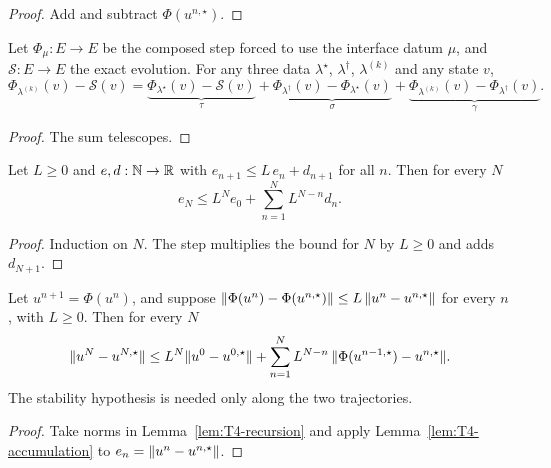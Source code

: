 \begin{proof}
  \leanok
  Add and subtract $\Phi(u^{n,\star})$.
\end{proof}

\begin{lemma}\label{lem:T4-split}
  \leanok
  Let $\Phi_\mu:E\to E$ be the composed step forced to use the interface datum
  $\mu$, and $\mathcal S:E\to E$ the exact evolution.  For any three data
  $\lambda^\star$, $\lambda^\dagger$, $\lambda^{(k)}$ and any state $v$,
  \[
    \Phi_{\lambda^{(k)}}(v)-\mathcal S(v)
    =\underbrace{\Phi_{\lambda^\star}(v)-\mathcal S(v)}_{\tau}
    +\underbrace{\Phi_{\lambda^\dagger}(v)-\Phi_{\lambda^\star}(v)}_{\sigma}
    +\underbrace{\Phi_{\lambda^{(k)}}(v)-\Phi_{\lambda^\dagger}(v)}_{\gamma}.
  \]
\end{lemma}

\begin{proof}
  \leanok
  The sum telescopes.
\end{proof}

\begin{lemma}[T4c, accumulation]\label{lem:T4-accumulation}
  \leanok
  Let $L\ge0$ and $e,d:\mathbb{N}\to\mathbb{R}$ with $e_{n+1}\le L\,e_n+d_{n+1}$ for all $n$.
  Then for every $N$
  \[
    e_N\le L^N e_0+\sum_{n=1}^{N}L^{N-n}d_n .
  \]
\end{lemma}

\begin{proof}
  \leanok
  Induction on $N$.  The step multiplies the bound for $N$ by $L\ge0$ and adds
  $d_{N+1}$.
\end{proof}

\begin{theorem}\label{thm:T4}
  \leanok
  Let $u^{n+1}=\Phi(u^n)$, and suppose
  $\lVert \Phi(u^n)-\Phi(u^{n,\star})\rVert\le L\,\lVert u^n-u^{n,\star}\rVert$ for every
  $n$, with $L\ge0$.  Then for every $N$
  \[
    \lVert u^N-u^{N,\star}\rVert\le L^N\lVert u^0-u^{0,\star}\rVert
      +\sum_{n=1}^{N}L^{N-n}\,\lVert \Phi(u^{n-1,\star})-u^{n,\star}\rVert .
  \]
  The stability hypothesis is needed only along the two trajectories.
\end{theorem}

\begin{proof}
  \leanok
  Take norms in Lemma~\ref{lem:T4-recursion} and apply
  Lemma~\ref{lem:T4-accumulation} to $e_n=\lVert u^n-u^{n,\star}\rVert$.
\end{proof}

